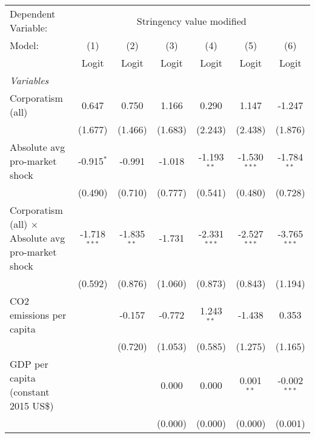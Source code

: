
\begingroup
\centering
\begin{tabular}{lcccccc}
   \toprule
   Dependent Variable: & \multicolumn{6}{c}{Stringency value modified}\\
   Model:                                                    & (1)            & (2)           & (3)     & (4)            & (5)             & (6)\\  
                                                             &  Logit         & Logit         & Logit   & Logit          & Logit           & Logit\\  
   \midrule
   \emph{Variables}\\
   Corporatism (all)                                         & 0.647          & 0.750         & 1.166   & 0.290          & 1.147           & -1.247\\   
                                                             & (1.677)        & (1.466)       & (1.683) & (2.243)        & (2.438)         & (1.876)\\   
   Absolute avg pro-market shock                             & -0.915$^{*}$   & -0.991        & -1.018  & -1.193$^{**}$  & -1.530$^{***}$  & -1.784$^{**}$\\   
                                                             & (0.490)        & (0.710)       & (0.777) & (0.541)        & (0.480)         & (0.728)\\   
   Corporatism (all) $\times$ Absolute avg pro-market shock  & -1.718$^{***}$ & -1.835$^{**}$ & -1.731  & -2.331$^{***}$ & -2.527$^{***}$  & -3.765$^{***}$\\   
                                                             & (0.592)        & (0.876)       & (1.060) & (0.873)        & (0.843)         & (1.194)\\   
   CO2 emissions per capita                                  &                & -0.157        & -0.772  & 1.243$^{**}$   & -1.438          & 0.353\\   
                                                             &                & (0.720)       & (1.053) & (0.585)        & (1.275)         & (1.165)\\   
   GDP per capita (constant 2015 US\$)                       &                &               & 0.000   & 0.000          & 0.001$^{**}$    & -0.002$^{***}$\\   
                                                             &                &               & (0.000) & (0.000)        & (0.000)         & (0.001)\\   

\end{tabular}
